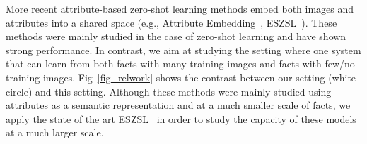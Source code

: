 \documentclass[runningheads]{llncs}
\begin{document}
More recent attribute-based zero-shot learning methods embed both images and attributes into a shared space (e.g.,  Attribute Embedding~\cite{akata2013label}, ESZSL~\cite{romera2015embarrassingly}). These methods were mainly studied in the case of zero-shot learning and have shown strong performance. In contrast, we aim at studying the setting where one system that can learn from both facts with many training images and facts with  few/no training images. Fig~\ref{fig_relwork} shows the contrast between our setting (white circle) and this setting. Although these methods were mainly studied using attributes as a semantic representation and at a much smaller scale of facts, we apply the state of the art ESZSL~\cite{romera2015embarrassingly} in order to study the capacity of these models at a much larger scale.

\end{document}
